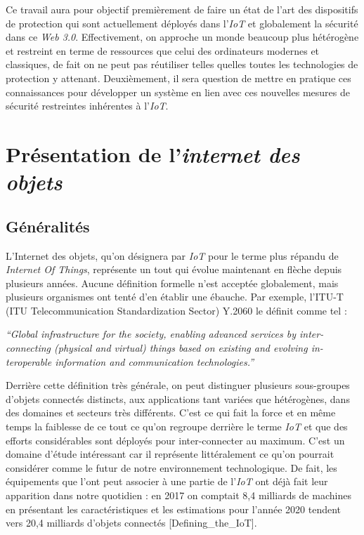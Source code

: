 \documentclass[]{article}
\begin{document}
\par Ce travail aura pour objectif premièrement de faire un état de l'art des dispositifs de protection qui sont actuellement déployés dans l'\textit{IoT} et globalement la sécurité dans ce \textit{Web 3.0}. Effectivement, on approche un monde beaucoup plus hétérogène et restreint en terme de ressources que celui des ordinateurs modernes et classiques, de fait on ne peut pas réutiliser telles quelles toutes les technologies de protection y attenant. Deuxièmement, il sera question de mettre en pratique ces connaissances pour développer un système en lien avec ces nouvelles mesures de sécurité restreintes inhérentes à l'\textit{IoT}.

\newpage
\section{Présentation de l'\textit{internet des objets}}

\subsection{Généralités}

\par L'Internet des objets, qu'on désignera par \textit{IoT} pour le terme plus répandu de \textit{Internet Of Things}, représente un tout qui évolue maintenant en flèche depuis plusieurs années. Aucune définition formelle n'est acceptée globalement, mais plusieurs organismes ont tenté d'en établir une ébauche. Par exemple, l'ITU-T (ITU Telecommunication Standardization Sector) Y.2060 le définit comme tel : 
\begin{center}
\textit{“Global  infrastructure  for  the  society,  enabling  advanced  services  by  inter-connecting (physical and virtual) things based on existing and evolving in-teroperable information and communication technologies.”}
\end{center}

\par Derrière cette définition très générale, on peut distinguer plusieurs sous-groupes d'objets connectés distincts, aux applications tant variées que hétérogènes, dans des domaines et secteurs très différents. C'est ce qui fait la force et en même temps la faiblesse de ce tout ce qu'on regroupe derrière le terme \textit{IoT} et que des efforts considérables sont déployés pour inter-connecter au maximum. C'est un domaine d'étude intéressant car il représente littéralement ce qu'on pourrait considérer comme le futur de notre environnement technologique. De fait, les équipements que l'ont peut associer à une partie de l'\textit{IoT} ont déjà fait leur apparition dans notre quotidien : en 2017 on comptait 8,4 milliards de machines en présentant les caractéristiques et les estimations pour l'année 2020 tendent vers 20,4 milliards d'objets connectés [Defining\_the\_IoT].  
\end{document}
